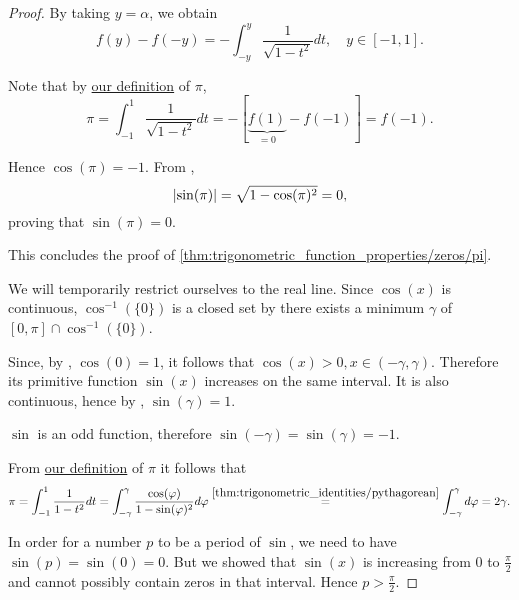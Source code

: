 \begin{proof}
  By taking \( y = \alpha \), we obtain
  \begin{equation*}
    f(y) - f(-y) = -\int_{-y}^y \frac 1 {\sqrt{1 - t^2}} dt, \quad y \in [-1, 1].
  \end{equation*}

  Note that by \hyperref[def:pi]{our definition} of \( \pi \),
  \begin{equation*}
    \pi
    =
    \int_{-1}^1 \frac 1 {\sqrt{1 - t^2}} dt
    =
    -[\underbrace{f(1)}_{=0} - f(-1)]
    =
    f(-1).
  \end{equation*}

  Hence \( \cos(\pi) = -1 \). From ,
  \begin{equation*}
    \left\vert \sin(\pi) \right\vert = \sqrt{1 - \cos(\pi)^2} = 0,
  \end{equation*}
  proving that \( \sin(\pi) = 0 \).

  This concludes the proof of \ref{thm:trigonometric_function_properties/zeros/pi}.

   We will temporarily restrict ourselves to the real line. Since \( \cos(x) \) is continuous, \( \cos^{-1}(\{ 0 \}) \) is a closed set by  there exists a minimum \( \gamma \) of \( [0, \pi] \cap \cos^{-1}(\{ 0 \}) \).

  Since, by , \( \cos(0) = 1 \), it follows that \( \cos(x) > 0, x \in (-\gamma, \gamma) \). Therefore its primitive function \( \sin(x) \) increases on the same interval. It is also continuous, hence by , \( \sin(\gamma) = 1 \).

  \( \sin \) is an odd function, therefore \( \sin(-\gamma) = \sin(\gamma) = -1 \).

  From \hyperref[def:pi]{our definition} of \( \pi \) it follows that
  \begin{equation*}
    \pi
    =
    \int_{-1}^1 \frac 1 {1 - t^2} dt
    =
    \int_{-\gamma}^\gamma \frac {\cos(\varphi)} {1 - \sin(\varphi)^2} d\varphi
    \overset {\ref{thm:trigonometric_identities/pythagorean}} =
    \int_{-\gamma}^\gamma d\varphi
    =
    2\gamma.
  \end{equation*}

  In order for a number \( p \) to be a period of \( \sin \), we need to have \( \sin(p) = \sin(0) = 0 \). But we showed that \( \sin(x) \) is increasing from \( 0 \) to \( \tfrac \pi 2 \) and cannot possibly contain zeros in that interval. Hence \( p > \tfrac \pi 2 \).


\end{proof}
